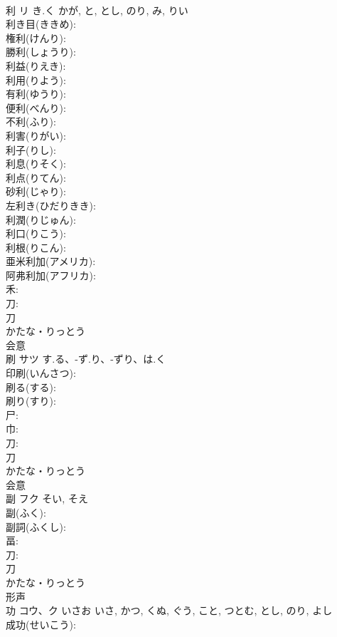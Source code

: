 \documentclass[8pt]{extreport}
\begin{document}
\begin{CJK}{UTF8}{min}
\\	利	リ	き.く	かが, と, とし, のり, み, りい	
\\	利き目(ききめ): 
\\	権利(けんり): 
\\	勝利(しょうり): 
\\	利益(りえき): 
\\	利用(りよう): 
\\	有利(ゆうり): 
\\	便利(べんり): 
\\	不利(ふり): 
\\	利害(りがい): 
\\	利子(りし): 
\\	利息(りそく): 
\\	利点(りてん): 
\\	砂利(じゃり): 
\\	左利き(ひだりきき): 
\\	利潤(りじゅん): 
\\	利口(りこう): 
\\	利根(りこん): 
\\	亜米利加(アメリカ): 
\\	阿弗利加(アフリカ): 
\\	禾: 
\\	刀: 
\\	刀	
\\	かたな・りっとう	
\\	会意 
\\	刷	サツ	す.る、-ず.り、-ずり、は.く		
\\	印刷(いんさつ): 
\\	刷る(する): 
\\	刷り(すり): 
\\	尸: 
\\	巾: 
\\	刀: 
\\	刀	
\\	かたな・りっとう	
\\	会意 
\\	副	フク		そい, そえ	
\\	副(ふく): 
\\	副詞(ふくし): 
\\	畐: 
\\	刀: 
\\	刀	
\\	かたな・りっとう	
\\	形声 
\\	功	コウ、ク	いさお	いさ, かつ, くぬ, ぐう, こと, つとむ, とし, のり, よし	
\\	成功(せいこう): 

\end{CJK}
\end{document}
